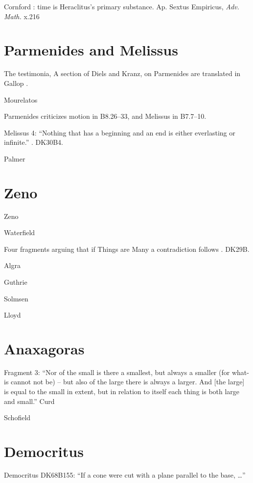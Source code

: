 \documentclass{article}
\begin{document}
Cornford \cite[p.~184]{religion}: time is Heraclitus's primary substance. Ap. Sextus Empiricus, {\em Adv. Math.} x.216



\section{Parmenides and Melissus}
The testimonia, A section of Diels and Kranz, on Parmenides are translated in Gallop \cite{gallop}.

Mourelatos \cite[pp.~118--119]{mourelatos}

Parmenides criticizes motion in B8.26--33, and Melissus in B7.7--10.

Melissus 4: ``Nothing that has a beginning and an end is either everlasting or infinite.'' \cite[p.~48]{ancilla}. DK30B4.

Palmer \cite{palmer}


\section{Zeno}
Zeno \cite[pp.~45, 67, 71--85]{lee}

Waterfield \cite{waterfield2009}

Four fragments arguing that if Things are Many a contradiction follows \cite[p.~47]{ancilla}. DK29B.

Algra \cite{algra}

Guthrie \cite{HGPII}

Solmsen \cite[p.~18]{experiments}

Lloyd \cite{lloyd1979}



\section{Anaxagoras}
Fragment 3: ``Nor of the small is there a smallest, but always a smaller (for what-is cannot not be) -- but also
of the large there is always a larger. And [the large] is equal to the small in extent, but in relation to itself each thing is both large and
small.'' Curd \cite[pp.~38--42]{curd2007}

Schofield \cite[Chapter 3]{schofield}



\section{Democritus}
Democritus DK68B155: ``If a cone were cut with a plane parallel to the base, \ldots'' \cite[p.~106]{ancilla}
\end{document}

